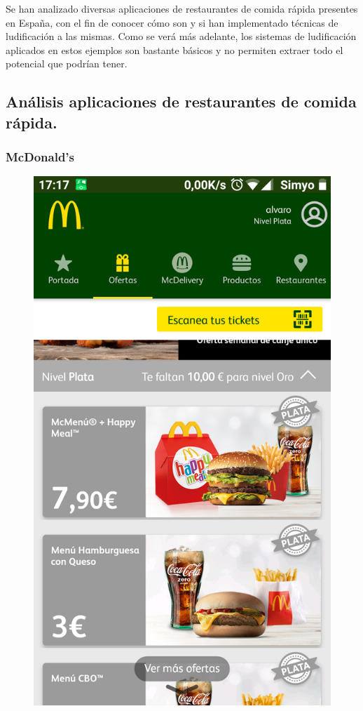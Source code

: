 \documentclass[twoside]{report}
\begin{document}
Se han analizado diversas aplicaciones de restaurantes de comida rápida presentes en España, con el fin de conocer cómo son y si han implementado técnicas de ludificación a las mismas. Como se verá más adelante, los sistemas de ludificación aplicados en estos ejemplos son bastante básicos y no permiten extraer todo el potencial que podrían tener.

\subsection{Análisis aplicaciones de restaurantes de comida rápida.}
\subsubsection{McDonald's}

\begin{figure}[H]
\begin{center}
\includegraphics[scale=0.25]{images/restaurantes/mcdo0.png}

\end{center}
\end{figure}
\end{document}
